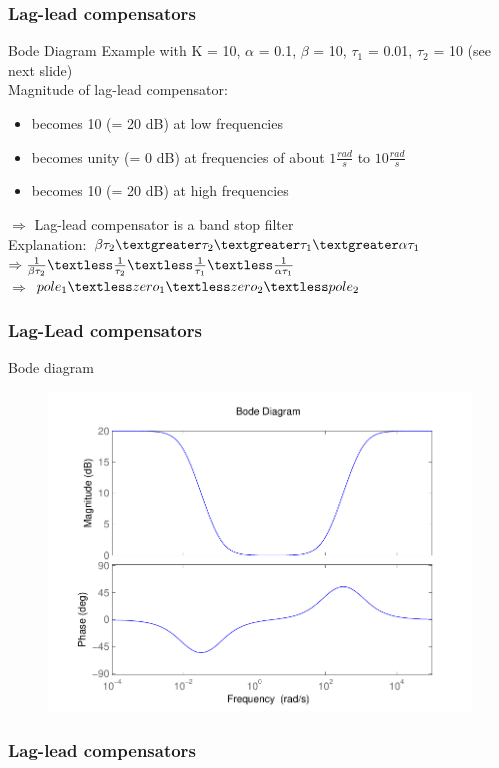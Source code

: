 \begin{frame}
\frametitle{Lag-lead compensators}
\begin{block}{Bode Diagram}
Example with K = 10, $\alpha$ = 0.1, $\beta$ = 10, $\tau_1$ = 0.01, $\tau_2$ = 10 (see next slide) \\
Magnitude of lag-lead compensator:
\begin{itemize}
\item becomes 10 (= 20 dB) at low frequencies
\item becomes unity (= 0 dB) at frequencies of about $1 \frac{rad}{s}$ to $10 \frac{rad}{s}$
\item becomes 10 (= 20 dB) at high frequencies
\end{itemize}
$\Rightarrow$ Lag-lead compensator is a band stop filter \\
Explanation: $\beta \tau_2 \textgreater \tau_2 \textgreater \tau_1 \textgreater \alpha \tau_1$ \\
$\Rightarrow \frac{1}{\beta \tau_2} \textless \frac{1}{\tau_2} \textless \frac{1}{\tau_1} \textless \frac{1}{\alpha \tau_1}$ \\
$\Rightarrow$ $pole_1 \textless zero_1 \textless zero_2 \textless pole_2$
\end{block}
\end{frame}

\begin{frame}
\frametitle{Lag-Lead compensators}
\begin{block}{Bode diagram}
\begin{figure}
	\centering
	\includegraphics[width=0.5
	\linewidth]{laglead}
\end{figure}	
\end{block}
\end{frame}

\begin{frame}
\frametitle{Lag-lead compensators}
\end{frame}




